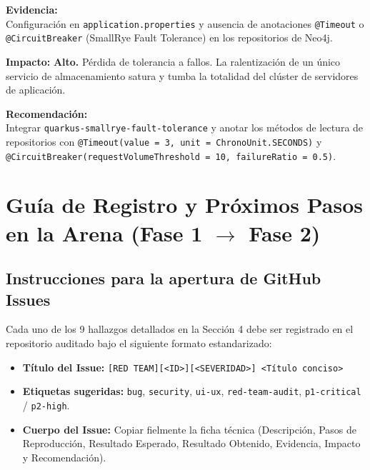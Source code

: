 \documentclass[10pt,a4paper]{article}
\newcommand{\code}[1]{\nolinkurl{#1}}
\begin{document}
\noindent\textbf{Evidencia:}\\
Configuración en \code{application.properties} y ausencia de anotaciones \code{@Timeout} o \code{@CircuitBreaker} (SmallRye Fault Tolerance) en los repositorios de Neo4j.

\noindent\textbf{Impacto:}
\textbf{Alto.} Pérdida de tolerancia a fallos. La ralentización de un único servicio de almacenamiento satura y tumba la totalidad del clúster de servidores de aplicación.

\noindent\textbf{Recomendación:}\\
Integrar \code{quarkus-smallrye-fault-tolerance} y anotar los métodos de lectura de repositorios con \code{@Timeout(value = 3, unit = ChronoUnit.SECONDS)} y \code{@CircuitBreaker(requestVolumeThreshold = 10, failureRatio = 0.5)}.

\newpage
\section{Guía de Registro y Próximos Pasos en la Arena (Fase 1 \texorpdfstring{$\rightarrow$}{->} Fase 2)}

\subsection{Instrucciones para la apertura de GitHub Issues}
Cada uno de los 9 hallazgos detallados en la Sección 4 debe ser registrado en el repositorio auditado bajo el siguiente formato estandarizado:
\begin{itemize}[leftmargin=*]
    \item \textbf{Título del Issue:} \texttt{[RED TEAM][<ID>][<SEVERIDAD>] <Título conciso>}
    \item \textbf{Etiquetas sugeridas:} \texttt{bug}, \texttt{security}, \texttt{ui-ux}, \texttt{red-team-audit}, \texttt{p1-critical} / \texttt{p2-high}.
    \item \textbf{Cuerpo del Issue:} Copiar fielmente la ficha técnica (Descripción, Pasos de Reproducción, Resultado Esperado, Resultado Obtenido, Evidencia, Impacto y Recomendación).
\end{itemize}
\end{document}
